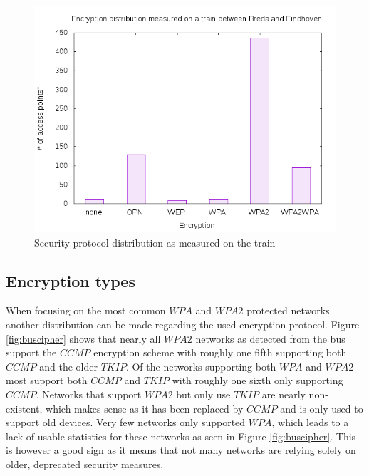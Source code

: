 \documentclass[letterpaper, 10 pt, conference]{ieeeconf}  %
\begin{document}
\begin{figure}[h]
\includegraphics[scale=0.5]{Figures/TrainEncryptionCount.png}
\caption{Security protocol distribution as measured on the train}
\label{fig:trainencdist}
\end{figure}





\subsection{Encryption types}
When focusing on the most common $WPA$ and $WPA2$ protected networks another distribution can be made regarding the used encryption protocol. Figure \ref{fig:buscipher} shows that nearly all $WPA2$ networks as detected from the bus support the $CCMP$ encryption scheme with roughly one fifth supporting both $CCMP$ and the older $TKIP$. Of the networks supporting both $WPA$ and $WPA2$ most support both $CCMP$ and $TKIP$ with roughly one sixth only supporting $CCMP$. Networks that support $WPA2$ but only use $TKIP$ are nearly non-existent, which makes sense as it has been replaced by $CCMP$ and is only used to support old devices. Very few networks only supported $WPA$, which leads to a lack of usable statistics for these networks as seen in Figure \ref{fig:buscipher}. This is however a good sign as it means that not many networks are relying solely on older, deprecated security measures. 
\end{document}
